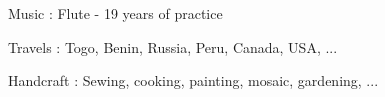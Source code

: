 
{\color{emphasis} \faMusic \hspace{0.1cm}  Music : } 
    Flute - 19 years of practice\\
  \vspace{0.25cm}

{\color{emphasis} \faGlobe \hspace{0.1cm} Travels : }  
    Togo, Benin, Russia, Peru, Canada, USA, ...\\
  \vspace{0.25cm}
  
{\color{emphasis} \faCut  \hspace{0.1cm} Handcraft : }
    Sewing, cooking, painting, mosaic, gardening, ...

